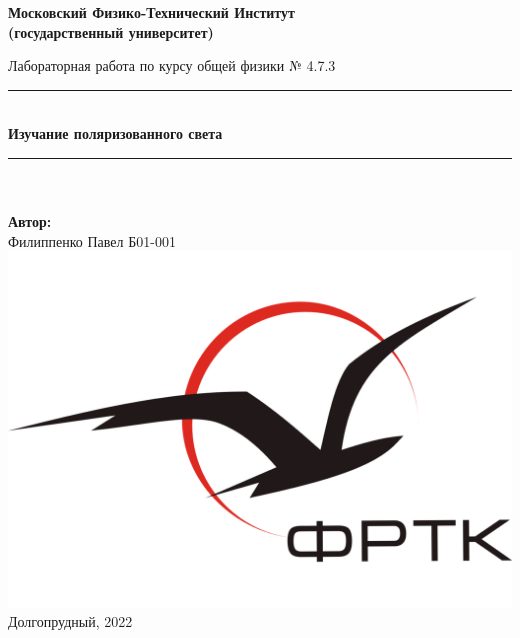 \newcommand{\HRule}{\rule{\linewidth}{0.7mm}} %
	
	\begin{center}
		\large\textbf{Московский Физико-Технический Институт}\\ %
		\large\textbf{(государственный университет)}
	
		\vfill
		
		\Large Лабораторная работа по курсу общей физики № 4.7.3\\[0.5cm] %
		
		
		\HRule
		\\[0.4cm]
		{ \huge \bfseries Изучание поляризованного света}%
		\\[0.4cm] 
		\HRule
		\\[0.5cm]
		
		\ \\
	\textbf{\large Автор:} \\	
	\large Филиппенко Павел Б01-001\\ %
		\vfill
		\hspace*{-0.8 cm}\includegraphics[width=100 pt]{../images/frkt_logo}\\ %
		\large Долгопрудный, 2022 %
	\end{center}

\newpage
\setcounter{page}{2}
\fancyfoot[c]{\thepage}
\fancyhead[R]{}
